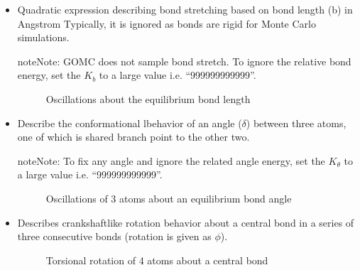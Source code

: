 \documentclass[letterpaper,10pt,english]{sphinxmanual}
\begin{document}
\begin{itemize}
\item {} 
\sphinxhyphen{} Quadratic expression describing bond stretching based on bond length (b) in Angstrom
\textendash{} Typically, it is ignored as bonds are rigid for Monte Carlo simulations.

\begin{sphinxadmonition}{note}{Note:}
GOMC does not sample bond stretch. To ignore the relative bond energy, set the \(K_b\) to a large value i.e. “999999999999”.
\end{sphinxadmonition}

\begin{figure}[htbp]
\centering
\capstart

\noindent{}
\caption{Oscillations about the equilibrium bond length}\label{\detokenize{input_file:id1}}\end{figure}

\item {} 
\sphinxhyphen{} Describe the conformational lbehavior of an angle (\(\delta\)) between three atoms, one of which is shared branch point to the other two.

\begin{sphinxadmonition}{note}{Note:}
To fix any angle and ignore the related angle energy, set the \(K_\theta\) to a large value i.e. “999999999999”.
\end{sphinxadmonition}

\begin{figure}[htbp]
\centering
\capstart

\noindent{}
\caption{Oscillations of 3 atoms about an equilibrium bond angle}\label{\detokenize{input_file:id2}}\end{figure}

\item {} 
\sphinxhyphen{} Describes crankshaft\sphinxhyphen{}like rotation behavior about a central bond in a series of three consecutive bonds (rotation is given as \(\phi\)).

\begin{figure}[htbp]
\centering
\capstart

\noindent{}
\caption{Torsional rotation of 4 atoms about a central bond}\label{\detokenize{input_file:id3}}\end{figure}


\end{itemize}
\end{document}
